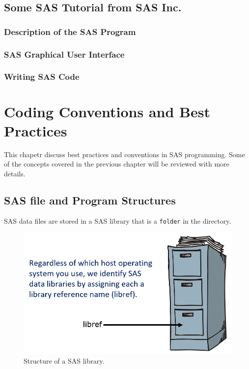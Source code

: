 \documentclass[
]{book}
\begin{document}
\hypertarget{some-sas-tutorial-from-sas-inc.}{%
\section{Some SAS Tutorial from SAS Inc.}\label{some-sas-tutorial-from-sas-inc.}}

\hypertarget{description-of-the-sas-program}{%
\subsection{Description of the SAS Program}\label{description-of-the-sas-program}}

\hypertarget{sas-graphical-user-interface}{%
\subsection{SAS Graphical User Interface}\label{sas-graphical-user-interface}}

\hypertarget{writing-sas-code}{%
\subsection{Writing SAS Code}\label{writing-sas-code}}

\hypertarget{coding-conventions-and-best-practices}{%
\chapter{Coding Conventions and Best Practices}\label{coding-conventions-and-best-practices}}

This chapetr discuss best practices and conventions in SAS programming. Some of the concepts covered in the previous chapter will be reviewed with more details.

\hypertarget{sas-file-and-program-structures}{%
\section{SAS file and Program Structures}\label{sas-file-and-program-structures}}

SAS data files are stored in a SAS library that is a \texttt{folder} in the directory.

\begin{figure}

{\centering \includegraphics[width=0.5\linewidth]{img02/w02-libref01} 

}

\caption{Structure of a SAS library.}\label{fig:unnamed-chunk-6}
\end{figure}
\end{document}
